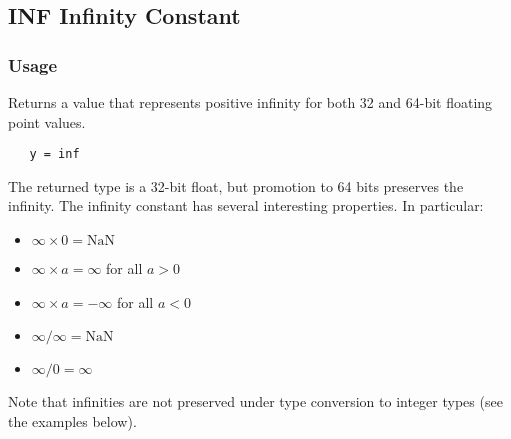 %
%
%
\subsection{INF Infinity Constant}
\subsubsection{Usage}
Returns a value that represents positive infinity 
for both 32 and 64-bit floating point values.
\begin{verbatim}
   y = inf
\end{verbatim}
The returned type is a 32-bit float, but promotion to
64 bits preserves the infinity.  The infinity constant has
several interesting properties.  In particular:
\begin{itemize}
\item $\infty \times 0 = \mathrm{NaN}$
\item $\infty \times a = \infty$ for all $a > 0$
\item $\infty \times a = -\infty$ for all $a < 0$
\item $\infty / \infty = \mathrm{NaN}$
\item $\infty / 0 = \infty$
\end{itemize}
Note that infinities are not preserved under type conversion to integer types (see the examples below).
